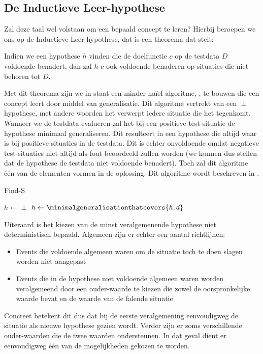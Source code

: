 \subsection{De Inductieve Leer-hypothese}
Zal deze taal wel volstaan om een bepaald concept te leren? Hierbij beroepen we ons op de Inductieve Leer-hypothese, dat is een theorema dat stelt:
\begin{theorem}
Indien we een hypothese $h$ vinden die de doelfunctie $c$ op de testdata $D$ voldoende benadert, dan zal $h$ $c$ ook voldoende benaderen op situaties die niet behoren tot $D$.
\end{theorem}
Met dit theorema zijn we in staat een minder na\"ief algoritme, , te bouwen die een concept leert door middel van generalisatie. Dit algoritme vertrekt van een $\perp$ hypothese, met andere woorden het verwerpt iedere situatie die het tegenkomt. Wanneer we de testdata evalueren zal het bij een positieve test-situatie de hypothese minimaal generaliseren. Dit resulteert in een hypothese die altijd waar is bij positieve situaties in de testdata. Dit is echter onvoldoende omdat negatieve test-situaties niet altijd als fout beoordeeld zullen worden (we kunnen dus stellen dat de hypothese de testdata niet voldoende benadert). Toch zal dit algoritme \'e\'en van de elementen vormen in de oplossing. Dit algoritme wordt beschreven in .
\begin{algorithm}[htb]                      %
\caption{Find-S}          %
\label{alg:findS}                           %
\begin{algorithmic}[1]                    %
\STATE $h\leftarrow\perp$
\STATE $h\leftarrow\minimalgeneralisationthatcovers{h,d}$
\ENDIF
\ENDFOR
\end{algorithmic}
\end{algorithm}
Uiteraard is het kiezen van de minst veralgemenende hypothese niet deterministisch bepaald. Algemeen zijn er echter een aantal richtlijnen:
\begin{itemize}
 \item Events die voldoende algemeen waren om de situatie toch te doen slagen worden niet aangepast
 \item Events die in de hypothese niet voldoende algemeen waren worden veralgemeend door een ouder-waarde te kiezen die zowel de oorspronkelijke waarde bevat en de waarde van de falende situatie
\end{itemize}
Concreet betekent dit dus dat bij de eerste veralgemening eenvoudigweg de situatie als nieuwe hypothese gezien wordt. Verder zijn er soms verschillende ouder-waarden die de twee waarden ondersteunen. In dat geval dient er eenvoudigweg \'e\'en van de mogelijkheden gekozen te worden.
